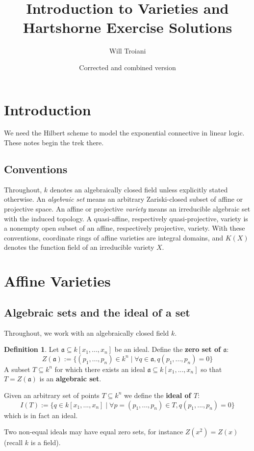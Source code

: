 \documentclass[12pt]{article}
\title{Introduction to Varieties and Hartshorne Exercise Solutions}
\author{Will Troiani}
\date{Corrected and combined version}
\theoremstyle{plain}
\theoremstyle{definition}
\newtheorem{defn}[thm]{Definition} %
\begin{document}
\maketitle
\tableofcontents
\section{Introduction}
We need the Hilbert scheme to model the exponential connective in linear logic. These notes begin the trek there.

\subsection*{Conventions}
Throughout, $k$ denotes an algebraically closed field unless explicitly stated otherwise. An \emph{algebraic set} means an arbitrary Zariski-closed subset of affine or projective space. An affine or projective \emph{variety} means an irreducible algebraic set with the induced topology. A quasi-affine, respectively quasi-projective, variety is a nonempty open subset of an affine, respectively projective, variety. With these conventions, coordinate rings of affine varieties are integral domains, and $K(X)$ denotes the function field of an irreducible variety $X$.
\section{Affine Varieties}
\subsection{Algebraic sets and the ideal of a set}
Throughout, we work with an algebraically closed field $k$.
\begin{defn}
Let $\mathfrak{a} \subseteq k[x_1,...,x_n]$ be an ideal. Define the \textbf{zero set of $\mathfrak{a}$}:
\begin{equation}
    Z(\mathfrak{a}) := \lbrace (p_1,...,p_n) \in k^n \mid \forall q \in \mathfrak{a}, q(p_1,...,p_n) = 0\rbrace
\end{equation}
A subset $T \subseteq k^n$ for which there exists an ideal $\mathfrak{a} \subseteq k[x_1,...,x_n]$ so that $T = Z(\mathfrak{a})$ is an \textbf{algebraic set}.

Given an arbitrary set of points $T \subseteq k^n$ we define the \textbf{ideal of $T$}:
\begin{equation}
    I(T) := \lbrace q \in k[x_1,...,x_n] \mid \forall p = (p_1,...,p_n) \in T, q(p_1,...,p_n) = 0 \rbrace
\end{equation}
which is in fact an ideal.
\end{defn}
Two non-equal ideals may have equal zero sets, for instance $Z(x^2) = Z(x)$ (recall $k$ is a field).
\end{document}
